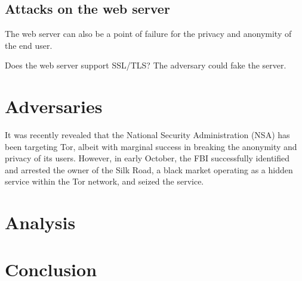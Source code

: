 \documentclass[journal]{IEEEtran}
\begin{document}
\subsection{Attacks on the web server}

The web server can also be a point of failure for the privacy and anonymity of the end user.

Does the web server support SSL/TLS? The adversary could fake the server.

\section{Adversaries}


It was recently revealed that the National Security Administration (NSA) has been targeting Tor, albeit with marginal success in breaking the anonymity and privacy of its users. However, in early October, the FBI successfully identified and arrested the owner of the Silk Road, a black market operating as a hidden service within the Tor network, and seized the service.



\section{Analysis}



\section{Conclusion}
\end{document}
